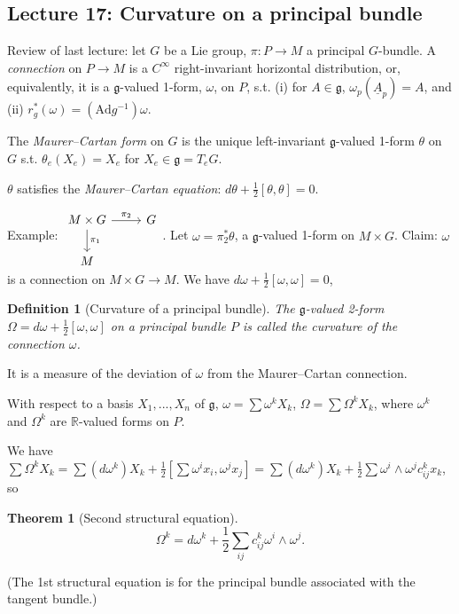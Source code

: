 \documentclass{article}
\theoremstyle{mystyle}
\newtheorem*{definition}{Definition}%
\newtheorem*{theorem*}{Theorem}
\theoremstyle{remark}
\numberwithin{equation}{section}
\begin{document}
\subsection{Lecture 17: Curvature on a principal bundle}

Review of last lecture: let $G$ be a Lie group, $\pi\colon P\rightarrow M$ a principal $G$-bundle. A \emph{connection} on $P\rightarrow M$ is a $C^\infty$ right-invariant horizontal distribution, or, equivalently, it is a $\mathfrak{g}$-valued 1-form, $\omega$, on $P$, s.t. (i) for $A\in \mathfrak{g}$, $\omega_p(\underline{A}_p) = A$, and (ii) $r^*_g(\omega) = (\mathrm{Ad}g^{-1})\omega$.

The \emph{Maurer--Cartan form} on $G$ is the unique left-invariant $\mathfrak{g}$-valued 1-form $\theta$ on $G$ s.t. $\theta_e(X_e) = X_e $ for $X_e \in \mathfrak{g} = T_eG$. 

$\theta$ satisfies the \emph{Maurer--Cartan equation}: $d\theta + \frac{1}{2}[\theta,\theta] = 0$. 

Example: $\begin{tikzcd}
M\times G\ar{r}{\pi_2} \ar{d}{\pi_1} & G\\ M & \end{tikzcd}$. Let $\omega = \pi_2^*\theta$, a $\mathfrak{g}$-valued 1-form on $M\times G$. Claim: $\omega$ is a connection on $M\times G\rightarrow M$. We have $d\omega +\frac{1}{2}[\omega,\omega] =0$, 

\begin{definition}[Curvature of a principal bundle] The $\mathfrak{g}$-valued 2-form $\Omega = d\omega + \frac{1}{2}[\omega,\omega]$ on a principal bundle $P$ is called the \emph{curvature} of the connection $\omega$.
\end{definition}

It is a measure of the deviation of $\omega$ from the Maurer--Cartan connection. 

With respect to a basis $X_1,...,X_n$ of $\mathfrak{g}$, $\omega  = \sum \omega^k X_k$, $\Omega = \sum \Omega^kX_k$, where $\omega^k$ and $\Omega^k$ are $\mathbb{R}$-valued forms on $P$. 

We have $\sum\Omega^kX_k = \sum(d\omega^k) X_k + \frac{1}{2}[\sum \omega^ix_i,\omega^jx_j] = \sum(d\omega^k)X_k + \frac{1}{2} \sum \omega^i\wedge \omega^j c^k_{ij} x_k$, so
\begin{theorem*}[Second structural equation]
$$\Omega^k = d\omega^k + \frac{1}{2} \sum_{ij}c^k_{ij} \omega^i\wedge \omega^j.$$
\end{theorem*}
(The 1st structural equation is for the principal bundle associated with the tangent bundle.)
\end{document}
